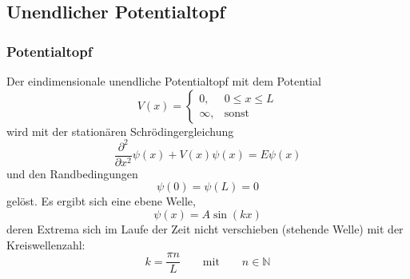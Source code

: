     \subsection{Unendlicher Potentialtopf}
        \subsubsection*{Potentialtopf}
            Der eindimensionale unendliche Potentialtopf mit dem Potential
            \begin{equation*}
                V(x) =
                \begin{cases}
                    0,      & 0\leq x \leq L \\
                    \infty, & \text{sonst}
                \end{cases}
            \end{equation*}
            wird mit der stationären Schrödingergleichung
            \begin{equation*}
                \frac{\partial^2}{\partial x^2} \psi(x) + V(x) \psi(x) = E \psi(x)
            \end{equation*}
            und den Randbedingungen
            \begin{equation*}
                \psi(0) = \psi(L) = 0
            \end{equation*}
            gelöst. Es ergibt sich eine ebene Welle,
            \begin{equation*}
                \psi(x) = A \sin(kx)
            \end{equation*}
            deren Extrema sich im Laufe der Zeit nicht verschieben (stehende Welle) mit der Kreiswellenzahl:
            \begin{equation}
                k = \frac{\pi n}{L} \qquad \text{mit} \qquad n \in \mathbb{N}
                \label{eqn:kPotentialtopf}
            \end{equation}


